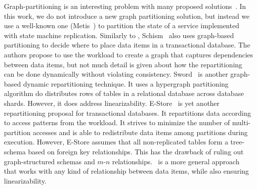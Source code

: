 Graph-partitioning is an interesting problem with many proposed solutions~\cite{Abou-Rjeili:2006,kernighan1970efficient,hendrickson2000graph}.
In this work, we do not introduce a new graph partitioning solution, but instead we use a well-known one (Metis~\cite{Abou-Rjeili:2006}) to partition the state of a service implemented with state machine replication.
Similarly to \dynastar{}, Schism~\cite{curino2010sch} also uses graph-based partitioning to decide where to place data items in a transactional database.
The authors propose to use the workload to create a graph that captures dependencies between data items, but not much detail is given about how the repartitioning can be done dynamically without violating consistency.
Sword~\cite{quamar2013sword} is another graph-based dynamic repartitioning technique.
It uses a hypergraph partitioning algorithm do distributes rows of tables in a relational database across database shards.
However, it does address linearizability.
E-Store~\cite{taft2014est} is yet another repartitioning proposal for transactional databases.
It repartitions data according to access patterns from the workload.
It strives to minimize the number of multi-partition accesses and is able to redistribute data items among partitions during execution.
However, E-Store assumes that all non-replicated tables form a tree-schema based on foreign key relationships.
This has the drawback of ruling out graph-structured schemas and \mbox{$m$-$n$} relationships.
\dynastar\ is a more general approach that works with any kind of relationship between data items, while also ensuring linearizability.
